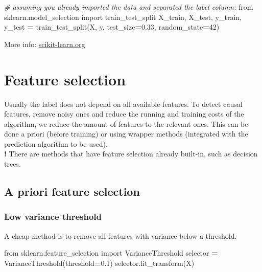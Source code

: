 \documentclass[
]{book}
\newenvironment{Shaded}{\begin{snugshade}}{\end{snugshade}}
\newcommand{\CommentTok}[1]{\textcolor[rgb]{0.56,0.35,0.01}{\textit{#1}}}
\newcommand{\DecValTok}[1]{\textcolor[rgb]{0.00,0.00,0.81}{#1}}
\newcommand{\FloatTok}[1]{\textcolor[rgb]{0.00,0.00,0.81}{#1}}
\newcommand{\ImportTok}[1]{#1}
\newcommand{\NormalTok}[1]{#1}
\newcommand{\OperatorTok}[1]{\textcolor[rgb]{0.81,0.36,0.00}{\textbf{#1}}}
\begin{document}
\begin{Shaded}
\begin{Highlighting}[]
\CommentTok{\# assuming you already imported the data and separated the label column:}
\ImportTok{from}\NormalTok{ sklearn.model\_selection }\ImportTok{import}\NormalTok{ train\_test\_split}
\NormalTok{X\_train, X\_test, y\_train, y\_test }\OperatorTok{=}\NormalTok{ train\_test\_split(X, y, test\_size}\OperatorTok{=}\FloatTok{0.33}\NormalTok{, random\_state}\OperatorTok{=}\DecValTok{42}\NormalTok{)}
\end{Highlighting}
\end{Shaded}

More info:
\href{https://scikit-learn.org/stable/modules/generated/sklearn.model_selection.train_test_split.html}{scikit-learn.org}

\hypertarget{feature-selection}{%
\section{Feature selection}\label{feature-selection}}

Usually the label does not depend on all available features. To detect
causal features, remove noisy ones and reduce the running and training
costs of the algorithm, we reduce the amount of features to the relevant
ones. This can be done a priori (before training) or using wrapper
methods (integrated with the prediction algorithm to be used).\\
\textbf{!} There are methods that have feature selection already built-in,
such as decision trees.

\hypertarget{a-priori-feature-selection}{%
\subsection{A priori feature selection}\label{a-priori-feature-selection}}

\hypertarget{low-variance-threshold}{%
\subsubsection{Low variance threshold}\label{low-variance-threshold}}

A cheap method is to remove all features with variance below a
threshold.

\begin{Shaded}
\begin{Highlighting}[]
\ImportTok{from}\NormalTok{ sklearn.feature\_selection }\ImportTok{import}\NormalTok{ VarianceThreshold}
\NormalTok{selector }\OperatorTok{=}\NormalTok{ VarianceThreshold(threshold}\OperatorTok{=}\FloatTok{0.1}\NormalTok{)}
\NormalTok{selector.fit\_transform(X)}
\end{Highlighting}
\end{Shaded}
\end{document}
